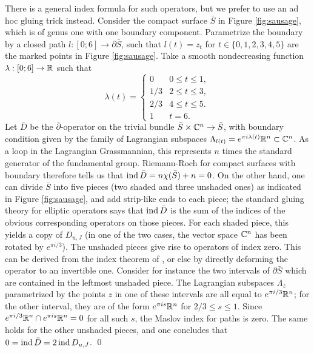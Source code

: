 \documentclass[10pt,letterpaper]{article}
\begin{document}
There is a general index formula for such operators, but we prefer to use an ad
hoc gluing trick instead. Consider the compact surface $\bar{S}$ in Figure
\ref{fig:sausage}, which is of genus one with one boundary component.
Parametrize the boundary by a closed path $l : [0;6] \rightarrow
\partial\bar{S}$, such that $l(t) = z_t$ for $t \in \{0,1,2,3,4,5\}$ are the
marked points in Figure \ref{fig:sausage}. Take a smooth nondecreasing function
$\lambda: [0;6] \rightarrow \mathbb{R}$ such that
\[
 \lambda(t) = \begin{cases}
 0 & 0 \leq t \leq 1, \\
 1/3 & 2 \leq t \leq 3, \\
 2/3 & 4 \leq t \leq 5. \\
 1 & t = 6.
 \end{cases}
\]
Let $\bar{D}$ be the $\bar\partial$-operator on the trivial bundle $\bar{S}
\times \mathbb{C}^n \rightarrow \bar{S}$, with boundary condition given by the family
of Lagrangian subspaces $\Lambda_{l(t)} = e^{\pi i \lambda(t)} \mathbb{R}^n \subset
\mathbb{C}^n$. As a loop in the Lagrangian Grassmannian, this represents $n$ times the
standard generator of the fundamental group. Riemann-Roch for compact surfaces
with boundary therefore tells us that $\mathrm{ind}\,\bar{D} = n\chi(\bar{S}) + n = 0$.
On the other hand, one can divide $\bar{S}$ into five pieces (two shaded and
three unshaded ones) as indicated in Figure \ref{fig:sausage}, and add
strip-like ends to each piece; the standard gluing theory for elliptic
operators says that $\mathrm{ind}\,\bar{D}$ is the sum of the indices of the obvious
corresponding operators on those pieces. For each shaded piece, this yields a
copy of $D_{u,J}$ (in one of the two cases, the vector space $\mathbb{C}^n$ has been
rotated by $e^{\pi i/3}$). The unshaded pieces give rise to operators of index
zero. This can be derived from the index theorem of \cite{robbin-salamon93}, or
else by directly deforming the operator to an invertible one. Consider for
instance the two intervals of $\partial\bar{S}$ which are contained in the
leftmost unshaded piece. The Lagrangian subspaces $\Lambda_z$ parametrized by
the points $z$ in one of these intervals are all equal to $e^{\pi i/3}\mathbb{R}^n$;
for the other interval, they are of the form $e^{\pi i s}\mathbb{R}^n$ for $2/3 \leq s
\leq 1$. Since $e^{\pi i/3} \mathbb{R}^n \cap e^{\pi i s}\mathbb{R}^n = 0$ for all such $s$,
the Maslov index for paths \cite{robbin-salamon93} is zero. The same holds for
the other unshaded pieces, and one concludes that $0 = \mathrm{ind}\, \bar{D} = 2\,
\mathrm{ind} \, D_{u,J}$. \qed
\end{document}
